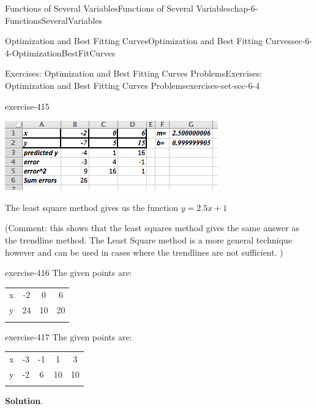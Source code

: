 \documentclass[oneside,10pt,]{book}
\numberwithin{equation}{section}
\newcommand{\hrulethin}  {\noalign{\hrule height 0.04em}}
\newcommand{\hrulethick} {\noalign{\hrule height 0.11em}}
\begin{document}
\begin{chapterptx}{Functions of Several Variables}{}{Functions of Several Variables}{}{}{chap-6-FunctionsSeveralVariables}
\begin{sectionptx}{Optimization and Best Fitting Curves}{}{Optimization and Best Fitting Curves}{}{}{sec-6-4-OptimizationBestFitCurves}
\begin{exercises-subsection-numberless}{Exercises: Optimization and Best Fitting Curves Problems}{}{Exercises: Optimization and Best Fitting Curves Problems}{}{}{exercises-set-sec-6-4}
\begin{divisionexercise}{1}{}{}{exercise-415}
\begin{sidebyside}{1}{0.2}{0.2}{0}
\begin{sbspanel}{0.6}
\includegraphics[width=1\linewidth]{images/sec6-4-sol1d.png}
\end{sbspanel}%
\end{sidebyside}%
\par
\hypertarget{p-2491}{}%
The least square method gives us the function \(y=2.5x+1\)%
\par
\hypertarget{p-2492}{}%
(Comment: this shows that the least squares method gives the same answer as the trendline method. The Least Square method is a more general technique however and can be used in cases where the trendlines are not sufficient. )%
\end{divisionexercise}%
\begin{divisionexercise}{2}{}{}{exercise-416}%
\hypertarget{p-2493}{}%
The given points are:%
\begin{sidebyside}{1}{0}{0}{0}%
\begin{sbspanel}{1}%
{\centering%
\begin{tabular}{cccc}\hrulethick
x&-2&0&6\tabularnewline\hrulethin
y&24&10&20\tabularnewline\hrulethin
\end{tabular}
\par}
\end{sbspanel}%
\end{sidebyside}%
\end{divisionexercise}%
\begin{divisionexercise}{3}{}{}{exercise-417}%
\hypertarget{p-2494}{}%
The given points are:%
\begin{sidebyside}{1}{0}{0}{0}%
\begin{sbspanel}{1}%
{\centering%
\begin{tabular}{ccccc}\hrulethick
x&-3&-1&1&3\tabularnewline\hrulethin
y&-2&6&10&10\tabularnewline\hrulethin
\end{tabular}
\par}
\end{sbspanel}%
\end{sidebyside}%
\par\smallskip%
\noindent\textbf{Solution}.\hypertarget{solution-211}{}\quad%
\leavevmode%
\begin{sidebyside}{1}{0.2}{0.2}{0}%

\end{sidebyside}
\end{divisionexercise}
\end{exercises-subsection-numberless}
\end{sectionptx}
\end{chapterptx}
\end{document}
